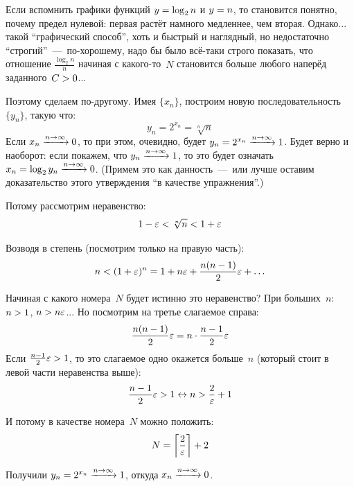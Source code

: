 \documentclass[a4paper,12pt]{article}
\begin{document}
  \begin{solution}
    
    Если вспомнить графики функций $y \hm= \log_2 n$ и $y \hm= n$, то становится понятно, почему предел нулевой: первая растёт намного медленнее, чем вторая.
    Однако... такой ``графический способ'', хоть и быстрый и наглядный, но недостаточно ``строгий''~---~по-хорошему, надо бы было всё-таки строго показать, что отношение $\frac{\log_2 n}{n}$ начиная с какого-то~$N$ становится больше любого наперёд заданного~$C \hm> 0$...
    
    Поэтому сделаем по-другому.
    Имея $\{x_n\}$, построим новую последовательность $\{y_n\}$, такую что:
    \[
      y_n = 2^{x_n} = \sqrt[n]{n}
    \]
    Если $x_n \hm{\xrightarrow{n \to \infty}} 0$, то при этом, очевидно, будет $y_n \hm= 2^{x_n} \hm{\xrightarrow{n \to \infty}} 1$.
    Будет верно и наоборот: если покажем, что $y_n \hm{\xrightarrow{n \to \infty}} 1$, то это будет означать $x_n \hm= \log_2 y_n \hm{\xrightarrow{n \to \infty}} 0$.
    (Примем это как данность~---~или лучше оставим доказательство этого утверждения ``в качестве упражнения''.)
    
    Потому рассмотрим неравенство:
    \[
      1 - \varepsilon < \sqrt[n]{n} < 1 + \varepsilon
    \]
    
    Возводя в степень (посмотрим только на правую часть):
    \[
      n < (1 + \varepsilon)^n = 1 + n \varepsilon + \frac{n(n - 1)}{2} \varepsilon + \ldots
    \]
    
    Начиная с какого номера~$N$ будет истинно это неравенство?
    При больших~$n$: $n \hm> 1$, $n \hm> n \eps$...
    Но посмотрим на третье слагаемое справа:
    \[
      \frac{n(n - 1)}{2} \varepsilon = n \cdot \frac{n - 1}{2} \varepsilon
    \]
    Если $\frac{n - 1}{2} \eps \hm> 1$, то это слагаемое одно окажется больше~$n$ (который стоит в левой части неравенства выше):
    \[
      \frac{n - 1}{2} \varepsilon > 1 \leftrightarrow n > \frac{2}{\varepsilon} + 1
    \]
    
    И потому в качестве номера~$N$ можно положить:
    \[
      N = \left\lceil\frac{2}{\varepsilon}\right\rceil + 2
    \]
    
    Получили $y_n \hm= 2^{x_n} \hm{\xrightarrow{n \to \infty}} 1$, откуда $x_n \hm{\xrightarrow{n \to \infty}} 0$.
  \end{solution}
  
  
  
\end{document}

